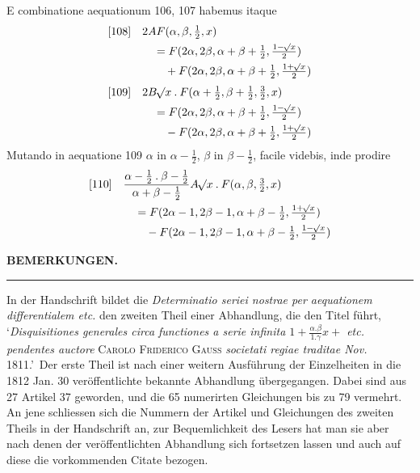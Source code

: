 E combinatione aequationum 106, 107 habemus itaque
\[
\begin{aligned}
{}[108]\quad&2AF(\alpha,\beta,\tfrac12,x)\\
&\quad=F(2\alpha,2\beta,\alpha+\beta+\tfrac12,\tfrac{1-\mathord{{}^{}\!\surd}x}2)\\&\qquad+F(2\alpha,2\beta,\alpha+\beta+\tfrac12,\tfrac{1+\mathord{{}^{}\!\surd}x}2)
\end{aligned}
\]
\[
\begin{aligned}
{}[109]\quad&2B\mathord{{}^{}\!\surd}x\mathbin{.}F(\alpha+\tfrac12,\beta+\tfrac12,\tfrac32,x)\\
&\quad=F(2\alpha,2\beta,\alpha+\beta+\tfrac12,\tfrac{1-\mathord{{}^{}\!\surd}x}2)\\&\qquad-F(2\alpha,2\beta,\alpha+\beta+\tfrac12,\tfrac{1+\mathord{{}^{}\!\surd}x}2)
\end{aligned}
\]
Mutando in aequatione 109 $\alpha$ in $\alpha-\frac12$, $\beta$ in $\beta-\frac12$, facile videbis, inde prodire
\[
\begin{aligned}
{}[110]\quad&\frac{\alpha-\tfrac12\mathbin{.}\beta-\tfrac12}{\alpha+\beta-\tfrac12}A\mathord{{}^{}\!\surd}x\mathbin{.}F(\alpha,\beta,\tfrac32,x)\\
&\quad=F(2\alpha-1,2\beta-1,\alpha+\beta-\tfrac12,\tfrac{1+\mathord{{}^{}\!\surd}x}2)\\&\qquad-F(2\alpha-1,2\beta-1,\alpha+\beta-\tfrac12,\tfrac{1-\mathord{{}^{}\!\surd}x}2)
\end{aligned}
\]
\clearpage{}
\begin{center}\textbf{BEMERKUNGEN.}\par\smallskip\rule{.15\linewidth}{.4pt}\end{center}
In der Handschrift bildet die \textit{Determinatio seriei nostrae per aequationem differentialem etc.} den zweiten Theil einer Abhandlung, die den Titel führt, \lq\textit{Disquisitiones generales circa functiones a serie infinita $1+\frac{\alpha.\beta}{1.\gamma}x+$ etc. pendentes auctore} \textsc{Carolo Friderico Gauss} \textit{societati regiae traditae Nov.} 1811.\rq\ Der erste Theil ist nach einer weitern Ausführung der Einzelheiten in die 1812 Jan. 30 veröffentlichte bekannte Abhandlung übergegangen. Dabei sind aus 27 Artikel 37 geworden, und die 65 numerirten Gleichungen bis zu 79 vermehrt. An jene schliessen sich die Nummern der Artikel und Gleichungen des zweiten Theils in der Handschrift an, zur Bequemlichkeit des Lesers hat man sie aber nach denen der veröffentlichten Abhandlung sich fortsetzen lassen und auch auf diese die vorkommenden Citate bezogen.

